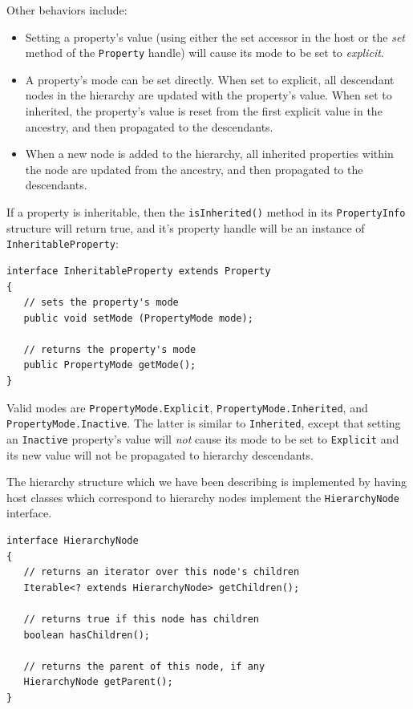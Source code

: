 Other behaviors include:

\begin{itemize}

\item Setting a property's value (using either the set accessor in the host
or the {\it set} method of the {\tt Property} handle) will cause its
mode to be set to {\it explicit}.

\item A property's mode can be set directly. When set to explicit, all
descendant nodes in the hierarchy are updated with the property's
value. When set to inherited, the property's value is reset from the
first explicit value in the ancestry, and then propagated to the
descendants.

\item When a new node is added to the hierarchy, all inherited properties
within the node are updated from the ancestry, and then propagated to
the descendants.

\end{itemize}

If a property is inheritable, then the {\tt isInherited()}
method in its {\tt PropertyInfo} structure will return true,
and it's property handle will be an instance of 
{\tt InheritableProperty}:
\begin{lstlisting}[]
interface InheritableProperty extends Property
{
   // sets the property's mode
   public void setMode (PropertyMode mode);

   // returns the property's mode
   public PropertyMode getMode();
}    
\end{lstlisting}
Valid modes are {\tt PropertyMode.Explicit}, 
{\tt PropertyMode.Inherited}, and {\tt PropertyMode.Inactive}. The latter
is similar to {\tt Inherited}, except that setting an {\tt Inactive}
property's value will {\it not} cause its mode to be set to 
{\tt Explicit} and its new value will not be propagated to hierarchy
descendants.

The hierarchy structure which we have been describing is implemented by
having host classes which correspond to hierarchy nodes implement the
{\tt HierarchyNode} interface.
\begin{lstlisting}[]
interface HierarchyNode 
{
   // returns an iterator over this node's children
   Iterable<? extends HierarchyNode> getChildren();

   // returns true if this node has children
   boolean hasChildren();
 
   // returns the parent of this node, if any
   HierarchyNode getParent();   
}    
\end{lstlisting}

